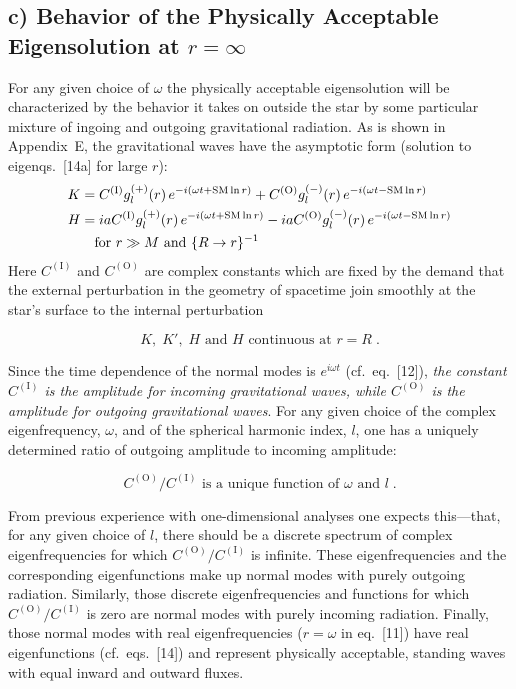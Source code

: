 \documentclass[12pt]{article}
\begin{document}
\subsection*{c) Behavior of the Physically Acceptable Eigensolution at $r = \infty$}

For any given choice of $\omega$ the physically acceptable eigensolution will be
characterized by the behavior it takes on outside the star by some particular mixture of
ingoing and outgoing gravitational radiation. As is shown in Appendix~E, the gravitational
waves have the asymptotic form (solution to eigenqs.~[14a] for large $r$):
\begin{align}
K &= C^{(\mathrm{I})} g_l^{(+)}(r)\, e^{-i(\omega t + \text{SM}\ln r)} + C^{(\mathrm{O})} g_l^{(-)}(r)\, e^{-i(\omega t - \text{SM}\ln r)} \notag \\
H &= i a C^{(\mathrm{I})} g_l^{(+)}(r)\, e^{-i(\omega t + \text{SM}\ln r)} - i a C^{(\mathrm{O})} g_l^{(-)}(r)\, e^{-i(\omega t - \text{SM}\ln r)} \notag \\
&\quad \text{for } r \gg M \text{ and } \{R \to r\}^{-1} \notag
\end{align}
\begin{equation}
\label{eq:18}
\tag{18}
\end{equation}
Here $C^{(\mathrm{I})}$ and $C^{(\mathrm{O})}$ are complex constants which are fixed by the demand that the
external perturbation in the geometry of spacetime join smoothly at the star's surface
to the internal perturbation

\begin{equation}
K,\; K',\; H \text{ and } H \text{ continuous at } r = R \;.
\label{eq:19}
\tag{19}
\end{equation}

Since the time dependence of the normal modes is $e^{i\omega t}$ (cf.\ eq.~[12]), \textit{the constant $C^{(\mathrm{I})}$
is the amplitude for incoming gravitational waves, while $C^{(\mathrm{O})}$ is the amplitude for outgoing
gravitational waves}. For any given choice of the complex eigenfrequency, $\omega$, and of the
spherical harmonic index, $l$, one has a uniquely determined ratio of outgoing amplitude
to incoming amplitude:

\begin{equation}
C^{(\mathrm{O})}/C^{(\mathrm{I})} \text{ is a unique function of } \omega \text{ and } l \;.
\label{eq:20}
\tag{20}
\end{equation}

From previous experience with one-dimensional analyses one expects this---that, for
any given choice of $l$, there should be a discrete spectrum of complex eigenfrequencies
for which $C^{(\mathrm{O})}/C^{(\mathrm{I})}$ is infinite. These eigenfrequencies and the corresponding eigenfunctions make up normal modes with purely outgoing radiation. Similarly, those discrete
eigenfrequencies and functions for which $C^{(\mathrm{O})}/C^{(\mathrm{I})}$ is zero are normal modes with
purely incoming radiation. Finally, those normal modes with real eigenfrequencies
($r = \omega$ in eq.~[11]) have real eigenfunctions (cf.\ eqs.~[14]) and represent physically
acceptable, standing waves with equal inward and outward fluxes.
\end{document}
